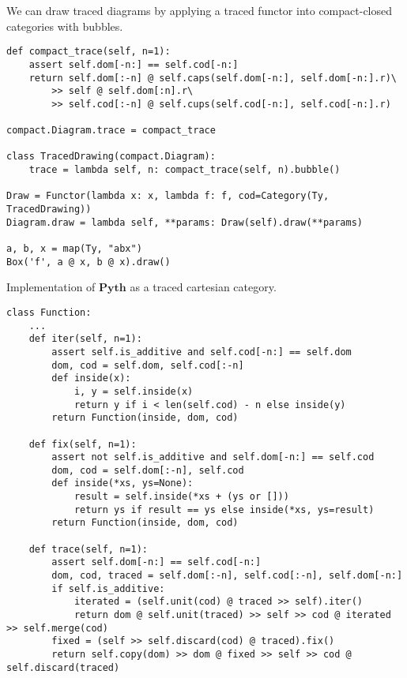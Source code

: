 \begin{example}
We can draw traced diagrams by applying a traced functor into compact-closed categories with bubbles.

\begin{verbatim}
def compact_trace(self, n=1):
    assert self.dom[-n:] == self.cod[-n:]
    return self.dom[:-n] @ self.caps(self.dom[-n:], self.dom[-n:].r)\
        >> self @ self.dom[:n].r\
        >> self.cod[:-n] @ self.cups(self.cod[-n:], self.cod[-n:].r)

compact.Diagram.trace = compact_trace

class TracedDrawing(compact.Diagram):
    trace = lambda self, n: compact_trace(self, n).bubble()

Draw = Functor(lambda x: x, lambda f: f, cod=Category(Ty, TracedDrawing))
Diagram.draw = lambda self, **params: Draw(self).draw(**params)

a, b, x = map(Ty, "abx")
Box('f', a @ x, b @ x).draw()
\end{verbatim}
\end{example}

\begin{python}\label{listing:traced-python}
{\normalfont Implementation of $\mathbf{Pyth}$ as a traced cartesian category.}

\begin{verbatim}
class Function:
    ...
    def iter(self, n=1):
        assert self.is_additive and self.cod[-n:] == self.dom
        dom, cod = self.dom, self.cod[:-n]
        def inside(x):
            i, y = self.inside(x)
            return y if i < len(self.cod) - n else inside(y)
        return Function(inside, dom, cod)

    def fix(self, n=1):
        assert not self.is_additive and self.dom[-n:] == self.cod
        dom, cod = self.dom[:-n], self.cod
        def inside(*xs, ys=None):
            result = self.inside(*xs + (ys or []))
            return ys if result == ys else inside(*xs, ys=result)
        return Function(inside, dom, cod)

    def trace(self, n=1):
        assert self.dom[-n:] == self.cod[-n:]
        dom, cod, traced = self.dom[:-n], self.cod[:-n], self.dom[-n:]
        if self.is_additive:
            iterated = (self.unit(cod) @ traced >> self).iter()
            return dom @ self.unit(traced) >> self >> cod @ iterated >> self.merge(cod)
        fixed = (self >> self.discard(cod) @ traced).fix()
        return self.copy(dom) >> dom @ fixed >> self >> cod @ self.discard(traced)
\end{verbatim}
\end{python}

